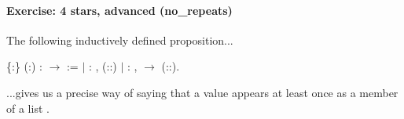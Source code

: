 \documentclass[12pt]{report}
\begin{document}
\paragraph{Exercise: 4 stars, advanced (no\_repeats)}

 The following inductively defined proposition... \begin{coqdoccode}
\coqdocemptyline
\coqdocnoindent
{}  \{:\} (:) :   \ensuremath{\rightarrow}  :=\coqdoceol
\coqdocindent{1.00em}
\ensuremath{|}  : \coqdockw{\ensuremath{\forall}} ,   (::)\coqdoceol
\coqdocindent{1.00em}
\ensuremath{|}  : \coqdockw{\ensuremath{\forall}}  ,    \ensuremath{\rightarrow}   (::).\coqdoceol
\coqdocemptyline
\end{coqdoccode}
...gives us a precise way of saying that a value  appears at
    least once as a member of a list . 
\end{document}

